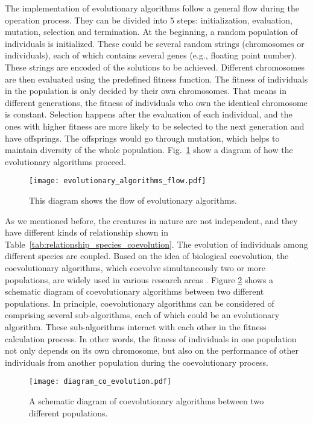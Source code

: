 The implementation of evolutionary algorithms follow a general flow during the operation process. They can be divided into $5$ steps: initialization, evaluation, mutation, selection and termination. At the beginning, a random population of individuals is initialized. These could be several random strings (chromosomes or individuals), each of which contains several genes (e.g., floating point number). These strings are encoded of the solutions to be achieved. Different chromosomes are then evaluated using the predefined fitness function. The fitness of individuals in the population is only decided by their own chromosomes. That means in different generations, the fitness of individuals who own the identical chromosome is constant. Selection happens after the evaluation of each individual, and the ones with higher fitness are more likely to be selected to the next generation and have offsprings. The offsprings would go through mutation, which helps to maintain diversity of the whole population.  Fig.~\ref{fig:evolutionary_algorithms_flow} show a diagram of how the evolutionary algorithms proceed. 

\begin{figure}[htbp]
  \centering
  \texttt{[image: evolutionary\_algorithms\_flow.pdf]}
  \caption{This diagram shows the flow of evolutionary algorithms.}
  \label{fig:evolutionary_algorithms_flow}
\end{figure}

As we mentioned before, the creatures in nature are not independent, and they have different kinds of relationship shown in Table~\ref{tab:relationship_species_coevolution}. The evolution of individuals among different species are coupled. Based on the idea of biological coevolution, the coevolutionary algorithms, which coevolve simultaneously two or more populations, are widely used in various research areas \cite{Rosin_1997}. Figure \ref{Fig: diagram_coevolution} shows a schematic diagram of coevolutionary algorithms between two different populations. In principle, coevolutionary algorithms can be considered of comprising several sub-algorithms, each of which could be an evolutionary algorithm. These sub-algorithms interact with each other in the fitness calculation process. In other words, the fitness of individuals in one population not only depends on its own chromosome, but also on the performance of other individuals from another population during the coevolutionary process. 

\begin{figure}[htbp]
  \centering
  \texttt{[image: diagram\_co\_evolution.pdf]}
  \caption{A schematic diagram of coevolutionary algorithms between two different populations.}
  \label{Fig: diagram_coevolution}
\end{figure}

